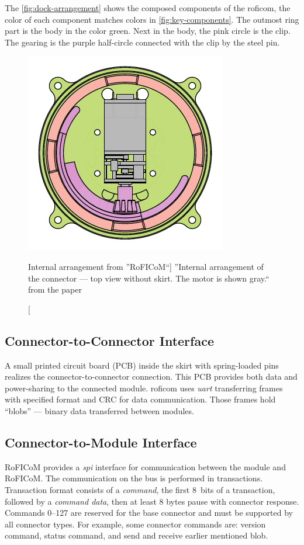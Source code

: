 \documentclass[
  digital,     %
  oneside,     %
  nosansbold,  %
  nocolorbold, %
  nolof,         %
  nolot,         %
]{fithesis4}
\begin{document}
The \autoref{fig:dock-arrangement} shows the composed components of the \acrshort{roficom}, the
color of each component matches colors in \autoref{fig:key-components}. The outmost ring part is the
body in the color green. Next in the body, the pink circle is the clip. The gearing is the purple
half-circle connected with the clip by the steel pin.

\begin{figure}
    \centering
    \includegraphics{ assets/dock-arrangement.pdf }
    \caption[Internal arrangement from ''RoFICoM``]{ ''Internal arrangement of the connector --- top view
    without skirt. The motor is shown gray.`` from the paper \cite{MrazekBarnat2019Roficom} }
    \label{fig:dock-arrangement}
\end{figure}

\subsection{ Connector-to-Connector Interface }

A small printed circuit board (PCB) inside the skirt with spring-loaded pins realizes the
connector-to-connector connection. This PCB provides both data and power-sharing to the connected
module.  \acrshort{roficom} uses \emph{\acrshort{uart}} transferring frames with specified format
and CRC for data communication. Those frames hold ``blobs'' --- binary data transferred between
modules. 

\subsection{ Connector-to-Module Interface }

RoFICoM provides a \emph{\acrshort{spi}} interface for communication between the module and RoFICoM.
The communication on the bus is performed in transactions. Transaction format consists of a
\emph{command}, the first 8~bits of a transaction, followed by a \emph{command data}, then at least
8 bytes pause with connector response. Commands \numrange{0}{127} are reserved for the base
connector and must be supported by all connector types. For example, some connector commands are:
version command, status command, and send and receive earlier mentioned blob.
\end{document}
